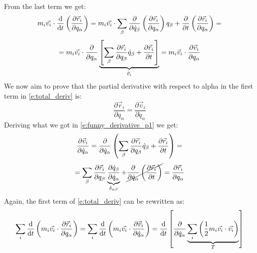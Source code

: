 From the last term we get:
\begin{equation}
    m_i\vec{v_i} \cdot \dv{}{t}\brackets{\dfrac{\partial \vec{r}_i}{\partial q_{\alpha}}} = m_i\vec{v_i} \cdot \bigsum_{\beta} \dfrac{\partial}{\partial \dot{q}_{\beta} }\brackets{\dfrac{\partial \vec{r}_i}{\partial q_{\alpha}}} q_{\beta} + \dfrac{\partial}{\partial t}\brackets{\dfrac{\partial \vec{r}_i}{\partial q_{\alpha}}} =
\end{equation}
\begin{equation} \label{e:funny_derivative_p1}
    = m_i\vec{v_i} \cdot \dfrac{\partial}{\partial q_{\alpha} }\underbrace{\left[\displaystyle\sum_{\beta} \dfrac{\partial \vec{r}_i}{\partial q_{\beta}} \dot{q}_{\beta} + \dfrac{\partial \vec{r}_i}{\partial t}\right]}_{\dot{\vec{v}}_i} = m_i\vec{v}_i \cdot \dfrac{\partial \vec{v}_i}{\partial q_{\alpha}}
\end{equation}
We now aim to prove that the partial derivative with respect to alpha in the first term in \eqref{e:total_deriv} is:
\begin{equation}
    \dfrac{\partial \vec{r}_i}{\partial q_{\alpha}} = \dfrac{\partial \vec{v}_i}{\partial \dot{q}_{\alpha}}
\end{equation}
Deriving what we got in \eqref{e:funny_derivative_p1} we get:
\begin{equation}
    \dfrac{\partial \vec{v}_i}{\partial \dot{q}_{\alpha}} = \dfrac{\partial }{\partial \dot{q}_{\alpha}} \left(\displaystyle\sum_{\beta}\dfrac{\partial \vec{r}_i}{\partial q_{\beta}} \dot{q}_{\beta} + \dfrac{\partial \vec{r}_i}{\partial t}\right) =
\end{equation}
\begin{equation}
     = \displaystyle\sum_{\beta}\dfrac{\partial \vec{r}_i}{\partial q_{\beta}} \underbrace{\dfrac{\partial \dot{q}_{\beta}}{\partial \dot{q}_{\alpha}}}_{\delta_{\alpha \beta}}  + \cancel{\dfrac{\partial }{\partial \dot{q}_{\alpha}}\left(\dfrac{\partial \vec{r}_i}{\partial t}\right)} = \dfrac{\partial \vec{r}_i}{\partial q_{\alpha}}
\end{equation}
Again, the first term of \eqref{e:total_deriv} can be rewritten as:
\begin{equation}
    \bigsum_i \dv{}{t}\brackets{m_i\vec{v_i} \cdot \dfrac{\partial \vec{r}_i}{\partial q_{\alpha}}} = \bigsum_i\dv{}{t}\brackets{m_i\vec{v_i} \cdot \dfrac{\partial \vec{v}_i}{\partial \dot{q}_{\alpha}}} = \dv{}{t}\left[\dfrac{\partial }{\partial \dot{q}_{\alpha}} \underbrace{\bigsum_i \brackets{\dfrac{1}{2}m_i \vec{v_i} \cdot \vec{v_i}}}_{T}\right]
\end{equation}
